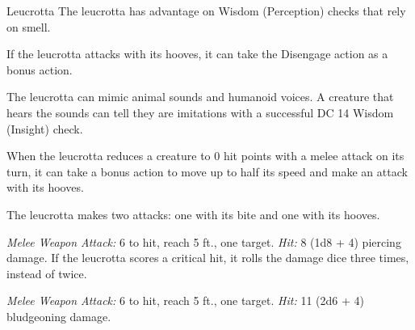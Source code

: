 \documentclass[10pt,a4paper,twoside,bg=print,twocolumn,openany,nodeprecatedcode]{dndbook}
\begin{document}
\begin{DndMonster}[float=t]{Leucrotta}
\DndMonsterBasics[
armor-class = {14 (natural armor)},
hit-points = {\DndDice{9d10 + 18}},
speed = {50 ft.}
]
\DndMonsterAbilityScores[
 str = 18,
 dex = 14,
 con = 15,
 int = 9,
 wis = 12,
 cha = 6
]
\DndMonsterDetails[
skills = {Deception +2, Perception +3},
senses = {darkvision 60 ft., passive perception 13},
languages = {Abyssal, Gnoll},
challenge = 3,
]
The leucrotta has advantage on Wisdom (Perception) checks that rely on smell.

If the leucrotta attacks with its hooves, it can take the Disengage action as a bonus action.

The leucrotta can mimic animal sounds and humanoid voices. A creature that hears the sounds can tell they are imitations with a successful DC 14 Wisdom (Insight) check.

When the leucrotta reduces a creature to 0 hit points with a melee attack on its turn, it can take a bonus action to move up to half its speed and make an attack with its hooves.

The leucrotta makes two attacks: one with its bite and one with its hooves.

\textsl{Melee Weapon Attack:} 6 to hit, reach 5 ft., one target. \textsl{Hit:} 8 (1d8 + 4) piercing damage. If the leucrotta scores a critical hit, it rolls the damage dice three times, instead of twice.

\textsl{Melee Weapon Attack:} 6 to hit, reach 5 ft., one target. \textsl{Hit:} 11 (2d6 + 4) bludgeoning damage.

\end{DndMonster}
\end{document}
